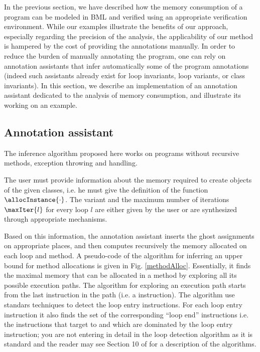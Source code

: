 In the previous section, we have described how the memory consumption
of a program can be modeled in BML and verified using an appropriate
verification environment. While our examples illustrate the benefits
of our approach, especially regarding the precision of the analysis,
the applicability of our method is hampered by the cost of providing
the annotations manually. In order to reduce the burden of manually
annotating the program, one can rely on annotation assistants that
infer automatically some of the program annotations (indeed such
assistants already exist for loop invariants, loop variants, or
class invariants). In this section, we describe an implementation of
an annotation assistant dedicated to the analysis of memory consumption,
and illustrate its working on an example.

\subsection{Annotation assistant}
The inference algorithm proposed here works on programs
 without recursive methods, exception throwing and handling.  


The user must provide information about the memory required to create objects of the given classes,
 i.e. he must give the definition  of the function $\allocInstance{\cdot}$.
 The variant and the maximum number of iterations $\maxIter{l}$ for every loop $l$  are either given by the
 user or are synthesized  through appropriate mechanisms. 


Based on this information, the annotation assistant 
inserts the ghost assignments on appropriate places, and then computes
recursively the memory allocated on each loop and method. 
A pseudo-code of the algorithm for inferring an upper bound for method allocations is given in Fig. \ref{methodAlloc}.
Essentially, it finds the maximal memory that can be allocated in a method by exploring all its possible execution paths.  
The algorithm for exploring an execution path starts from the last instruction in the path (i.e. a \return{} instruction). 
The algorithm use standars techniques to detect the loop entry instructions. For each loop entry instruction it also finds  
the set  of the corresponding ``loop end'' instructions i.e. the  instructions  that target   to  and which are dominated by
the loop entry instruction; you are not entering in detail in the loop detection
algorithm as it is standard and the reader may  see Section 10 of 
 \cite{ASU86cpt} for a description of the algorithms.

